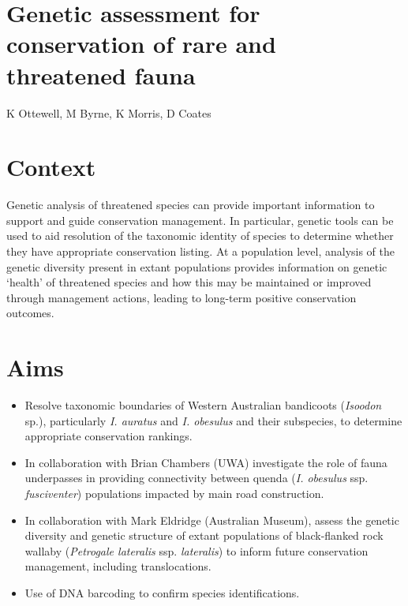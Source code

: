 \documentclass[version=last,
    paper=a4, %
    10pt, %
    usenames,
    dvipsnames,
    oneside, %
    headings=openany, %
    DIV=15 %
]{scrbook}
\begin{document}
\section*{Genetic assessment for conservation of rare and threatened fauna
}

K Ottewell, M Byrne, K Morris, D Coates


\section*{Context}
Genetic analysis of threatened species can provide important information
to support and guide conservation management. In particular, genetic
tools can be used to aid resolution of the taxonomic identity of species
to determine whether they have appropriate conservation listing. At a
population level, analysis of the genetic diversity present in extant
populations provides information on genetic `health' of threatened
species and how this may be maintained or improved through management
actions, leading to long-term positive conservation outcomes.



\section*{Aims}
\begin{itemize}
\itemsep1pt\parskip0pt
\item
  Resolve taxonomic boundaries of Western Australian bandicoots
  (\emph{Isoodon} sp.), particularly \emph{I. auratus} and \emph{I.
  obesulus} and their subspecies, to determine appropriate conservation
  rankings.
\item
  In collaboration with Brian Chambers (UWA) investigate the role of
  fauna underpasses in providing connectivity between quenda (\emph{I.
  obesulus} ssp. \emph{fusciventer}) populations impacted by main road
  construction.
\item
  In collaboration with Mark Eldridge (Australian Museum), assess the
  genetic diversity and genetic structure of extant populations of
  black-flanked rock wallaby (\emph{Petrogale lateralis} ssp.
  \emph{lateralis}) to inform future conservation management, including
  translocations.
\item
  Use of DNA barcoding to confirm species identifications.
\end{itemize}
\end{document}
